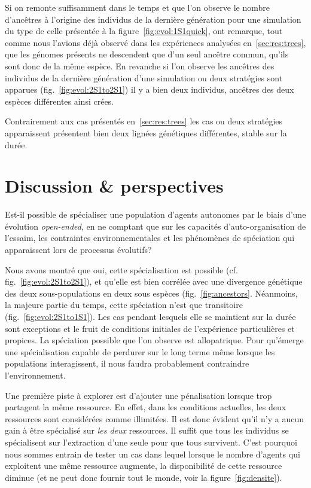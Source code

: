 \documentclass[a4paper,10pt]{report}
\begin{document}
	Si on remonte suffisamment dans le temps et que l'on observe le nombre d'ancêtres à l'origine des individus de la dernière génération pour une simulation du type de celle présentée à la figure~\ref{fig:evol:1S1quick}, ont remarque, tout comme nous l'avions déjà observé dans les expériences analysées en~\ref{sec:res:trees}, que les génomes présents ne descendent que d'un seul ancêtre commun, qu'ils sont donc de la même espèce. En revanche si l'on observe les ancêtres des individus de la dernière génération d'une simulation ou deux stratégies sont apparues (fig.~\ref{fig:evol:2S1to2S1}) il y a bien deux individus, ancêtres des deux espèces différentes ainsi crées.
	
	
	Contrairement aux cas présentés en~\ref{sec:res:trees} les cas ou deux stratégies apparaissent présentent bien deux lignées génétiques différentes, stable sur la durée.
	
	
	\chapter{Discussion \& perspectives }\label{ch:discussion}
	
	Est-il possible de spécialiser une population d'agents autonomes par le biais d'une évolution \emph{open-ended}, en ne comptant que sur les capacités d'auto-organisation de l'essaim, les contraintes environnementales et les phénomènes de spéciation qui apparaissent lors de processus évolutifs?
	
	Nous avons montré que oui, cette spécialisation est possible (cf. fig.~\ref{fig:evol:2S1to2S1}), et qu'elle est bien corrélée avec une divergence génétique des deux sous-populations en deux sous espèces (fig.~\ref{fig:ancestors}. Néanmoins, la majeure partie du temps, cette spéciation n'est que transitoire (fig.~\ref{fig:evol:2S1to1S1}). Les cas pendant lesquels elle se maintient sur la durée sont exceptions et le fruit de conditions initiales de l'expérience particulières et propices.
	La spéciation possible que l'on observe est allopatrique. Pour qu'émerge une spécialisation capable de perdurer sur le long terme même lorsque les populations interagissent, il nous faudra probablement contraindre l'environnement. 
	
	Une première piste à explorer est d'ajouter une pénalisation lorsque trop partagent la même ressource. En effet, dans les conditions actuelles, les deux ressources sont considérées comme illimitées. Il est donc évident qu'il n'y a aucun gain à être spécialisé sur \emph{les deux} ressources. Il suffit que tous les individus se spécialisent sur l'extraction d'une seule pour que tous survivent. C'est pourquoi nous sommes entrain de tester un cas dans lequel lorsque le nombre d'agents qui exploitent une même ressource augmente, la disponibilité de cette ressource diminue (et ne peut donc fournir tout le monde, voir la figure~\ref{fig:densite}).
	
\end{document}
